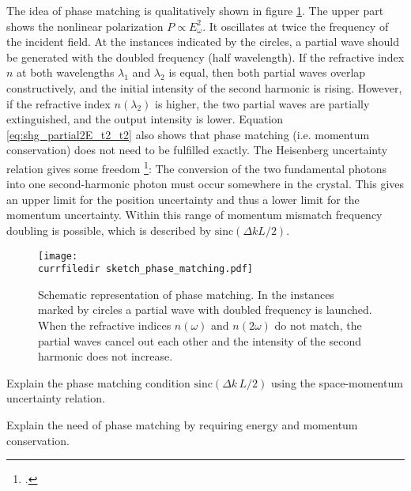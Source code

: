 The idea of phase matching is qualitatively shown in figure
\ref{fig:shg_phase_matching}. The upper part shows the nonlinear 
polarization $P \propto E_{\omega}^2$. It oscillates
at twice the frequency of the incident field. At the instances indicated by the circles,  a partial wave should  be generated with
the doubled frequency (half wavelength). If the
refractive index $n$ at both wavelengths $\lambda_1$ and
$\lambda_2$ is equal, then both partial waves overlap
constructively, and the initial intensity of the second harmonic
is rising. However, if the refractive index $n(\lambda_2)$ is higher,
the two partial waves are partially extinguished, and the
output intensity is lower. Equation
\ref{eq:shg_partial2E_t2_t2} also shows that 
phase matching (i.e. momentum conservation) does not need to be fulfilled  exactly.  The Heisenberg uncertainty relation gives some freedom
\footcite{Demtroeder_laser,SalehTeich1991}:
The conversion of the two fundamental photons into one second-harmonic photon 
must occur somewhere in the crystal. This gives an upper limit for  the position uncertainty and thus a lower limit for the momentum uncertainty.
Within  this  range of momentum mismatch frequency doubling  is possible, which is described by $\text{sinc}(\Delta k L/2)$.




\begin{figure}
\center
\texttt{[image: \\currfiledir sketch\_phase\_matching.pdf]}
\caption{Schematic representation of 
phase matching.
In the instances marked by circles a
partial wave with doubled frequency is launched. When the
refractive indices $n(\omega)$ and $n(2 \omega)$ do not
match, the partial waves cancel out each other  and
the intensity of the second harmonic does not increase.}
\label{fig:shg_phase_matching}
\end{figure}


\begin{questions}

\item Explain the phase matching condition $\text{sinc} ( \Delta k \, L /2 )$ using the space-momentum uncertainty relation.

\item Explain the need of phase matching by requiring energy and momentum conservation.

\end{questions}


